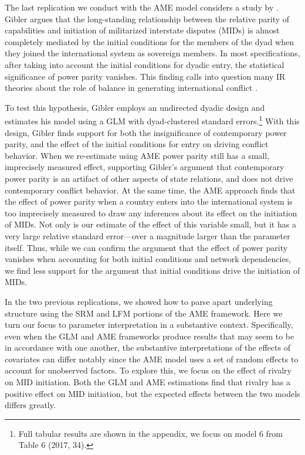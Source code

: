 The last replication we conduct with the AME model considers a study by \citet{gibler:2017}. Gibler argues that the long-standing relationship between the relative parity of capabilities and initiation of militarized interstate disputes (MIDs) is almost completely mediated by the initial conditions for the members of the dyad when they joined the international system as sovereign members. In most specifications, after taking into account the initial conditions for dyadic entry, the statistical significance of power parity vanishes. This finding calls into question many IR theories about the role of balance in generating international conflict \citep{organski:1958}.

To test this hypothesis, Gibler employs an undirected dyadic design and estimates his model using a GLM with dyad-clustered standard errors.\footnote{Full tabular results are shown in the appendix, we focus on model 6 from Table 6 (2017, 34).} With this design, Gibler finds support for both the insignificance of contemporary power parity, and the effect of the initial conditions for entry on driving conflict behavior. When we re-estimate using AME power parity still has a small, imprecisely measured effect, supporting Gibler's argument that contemporary power parity is an artifact of other aspects of state relations, and does not drive contemporary conflict behavior. At the same time, the AME approach finds that the effect of power parity when a country enters into the international system is too imprecisely measured to draw any inferences about its effect on the initiation of MIDs. Not only is our estimate of the effect of this variable small, but it has a very large relative standard error---over a magnitude larger than the parameter itself. Thus, while we can confirm the argument that the effect of power parity vanishes when accounting for both initial conditions and network dependencies, we find less support for the argument that initial conditions drive the initiation of MIDs.

In the two previous replications, we showed how to parse apart underlying structure using the SRM and LFM portions of the AME framework. Here we turn our focus to parameter interpretation in a substantive context. Specifically, even when the GLM and AME frameworks produce results that may seem to be in accordance with one another, the substantive interpretations of the effects of covariates can differ notably since the AME model uses a set of random effects to account for unobserved factors. To explore this, we focus on the effect of rivalry on MID initiation. Both the GLM and AME estimations find that rivalry has a positive effect on MID initiation, but the expected effects between the two models differs greatly.

